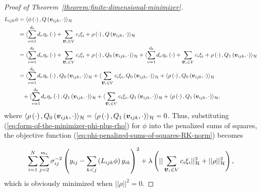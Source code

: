 \begin{proof}[Proof of Theorem~\ref{theorem:finite-dimensional-minimizer}]
\begin{align*}
L_{ijk} \phi &= \langle \phi\left(\cdot\right), Q\left(\mbox{\boldmath $v$}_{ijk}, \cdot\right) \rangle_{\mathcal{H}} \\
&=  \langle  \sum_{\nu = 1}^{d_0} d_\nu \eta_\nu\left(\cdot\right) + \sum_{\mbox{\boldmath $v$}_{i} \in V} c_i \xi_i + \rho\left(\cdot\right), Q\left(\mbox{\boldmath $v$}_{ijk}, \cdot\right) \rangle_{\mathcal{H}} \\
&= \langle  \sum_{\nu = 1}^{d_0} d_\nu \eta_\nu\left(\cdot\right) + \sum_{\mbox{\boldmath $v$}_{i} \in V} c_i \xi_i + \rho\left(\cdot\right), Q_0\left(\mbox{\boldmath $v$}_{ijk}, \cdot\right) \rangle_{\mathcal{H}} + \langle \sum_{\nu = 1}^{d_0} d_\nu \eta_\nu\left(\cdot\right) + \sum_{\mbox{\boldmath $v$}_{i} \in V} c_i \xi_i + \rho\left(\cdot\right), Q_1\left(\mbox{\boldmath $v$}_{ijk}, \cdot\right) \rangle_{\mathcal{H}} \\
&=  \langle  \sum_{\nu = 1}^{d_0} d_\nu \eta_\nu\left(\cdot\right) ,  Q_0\left(\mbox{\boldmath $v$}_{ijk}, \cdot\right) \rangle_{\mathcal{H}} +  \langle   \sum_{\mbox{\boldmath $v$}_{i} \in V} c_i \xi_i  ,  Q_0\left(\mbox{\boldmath $v$}_{ijk}, \cdot\right) \rangle_{\mathcal{H}} + \langle \rho\left(\cdot\right), Q_0\left(\mbox{\boldmath $v$}_{ijk}, \cdot\right) \rangle_{\mathcal{H}} \\ 
&\phantom{=} + \langle  \sum_{\nu = 1}^{d_0} d_\nu \eta_\nu\left(\cdot\right) ,  Q_1\left(\mbox{\boldmath $v$}_{ijk}, \cdot\right) \rangle_{\mathcal{H}} +  \langle   \sum_{\mbox{\boldmath $v$}_{i} \in V} c_i \xi_i  ,  Q_1\left(\mbox{\boldmath $v$}_{ijk}, \cdot\right) \rangle_{\mathcal{H}} + \langle \rho\left(\cdot\right), Q_1\left(\mbox{\boldmath $v$}_{ijk}, \cdot\right) \rangle_{\mathcal{H}}, 
\end{align*}
\noindent
where $\langle \rho\left(\cdot\right), Q_0\left(\mbox{\boldmath $v$}_{ijk}, \cdot\right) \rangle_{\mathcal{H}} = \langle \rho\left(\cdot\right), Q_1\left(\mbox{\boldmath $v$}_{ijk}, \cdot\right) \rangle_{\mathcal{H}} = 0$. Thus, substituting (\ref{eq:form-of-the-minimizer-phi-plus-rho}) for $\phi$ into the penalized sums of squares, the objective function (\ref{eq:phi-penalized-sums-of-squares-RK-norm}) becomes

\begin{equation*} 
\sum_{i=1}^N \sum_{j=2}^{m_i} \sigma^{-2}_{ij}\left( y_{ij} - \sum_{k<j}\left( L_{ijk}\phi\right) y_{ik}  \right)^2 + \lambda \left(\vert \vert \sum_{\mbox{\boldmath $v$}_i \in V} c_i \xi_i \vert \vert_{\mathcal{H}}^2 + \vert \vert \rho \vert \vert_{\mathcal{H}}^2\right),
\end{equation*} 
\noindent
which is obviously minimized when $\vert \vert \rho \vert \vert^2 = 0$.
 
\end{proof}
 
